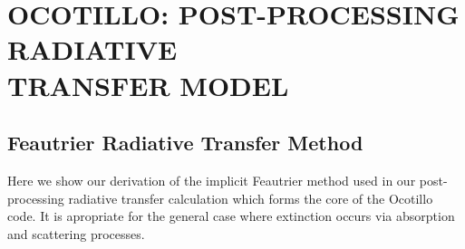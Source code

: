 \section{\texorpdfstring{\MakeUppercase{ocotillo: post-processing radiative\\transfer model}}{ocotillo: post-processing radiative\\transfer model}}
\label{sec:Appendix-RTModel}


\subsection{Feautrier Radiative Transfer Method}
\label{sec:Apdx-Feautrier}

Here we show our derivation of the implicit Feautrier method used in our post-processing radiative transfer calculation which forms the core of the Ocotillo code.
It is apropriate for the general case where extinction occurs via absorption and scattering processes.

